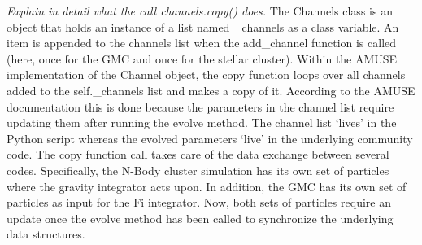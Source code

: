 \documentclass{aa}
\begin{document}
\textit{Explain in detail what the call channels.copy() does.}
The Channels class is an object that holds an instance of a list named \_channels as a class variable. An item is appended to the channels list when the add\_channel function is called (here, once for the GMC and once for the stellar cluster). Within the AMUSE implementation of the Channel object, the copy function loops over all channels added to the self.\_channels list and makes a copy of it. According to the AMUSE documentation this is done because the parameters in the channel list require updating them after running the evolve method. The channel list `lives' in the Python script whereas the evolved parameters `live' in the underlying community code. The copy function call takes care of the data exchange between several codes. Specifically, the N-Body cluster simulation has its own set of particles where the gravity integrator acts upon. In addition, the GMC has its own set of particles as input for the Fi integrator. Now, both sets of particles require an update once the evolve method has been called to synchronize the underlying data structures.
\end{document}
